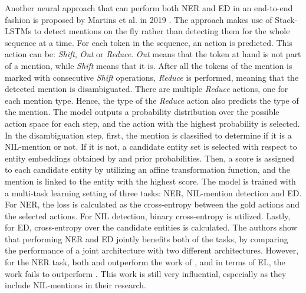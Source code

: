 \documentclass{report}
\theoremstyle{definition}
\theoremstyle{remark}
\begin{document}
Another neural approach that can perform both NER and ED in an end-to-end fashion is proposed by Martins et al. in 2019 \cite{StackLSTM}. The approach makes use of Stack-LSTMs \cite{actualStackLSTM} to detect mentions on the fly rather than detecting them for the whole sequence at a time. For each token in the sequence, an action is predicted. This action can be: \textit{Shift}, \textit{Out} or \textit{Reduce}.  \textit{Out} means that the token at hand is not part of a mention, while \textit{Shift} means that it is.  After all the tokens of the mention is marked with consecutive \textit{Shift} operations, \textit{Reduce} is performed, meaning that the detected mention is disambiguated. There are multiple \textit{Reduce} actions, one for each mention type. Hence, the type of the \textit{Reduce} action also predicts the type of the mention. The model outputs a probability distribution over the possible action space for each step, and the action with the highest probability is selected. In the disambiguation step, first, the mention is classified to determine if it is a NIL-mention or not. If it is not, a candidate entity set is selected with respect to entity embeddings obtained by \cite{yamada-etal-2017-learning} and prior probabilities. Then, a score is assigned to each candidate entity by utilizing an affine transformation function, and the mention is linked to the entity with the highest score. The model is trained with a multi-task learning setting of three tasks: NER, NIL-mention detection and ED. For NER, the loss is calculated as the cross-entropy between the gold actions and the selected actions. For NIL detection, binary cross-entropy is utilized. Lastly, for ED, cross-entropy over the candidate entities is calculated. The authors show that performing NER and ED jointly benefits both of the tasks, by comparing the performance of a joint architecture with two different architectures. However, for the NER task, both \cite{flairpaper} and \cite{BERT} outperform the work of \cite{StackLSTM}, and in terms of EL, the work fails to outperform \cite{kolitsas}. This work is still very influential, especially as they include NIL-mentions in their research.
\end{document}
